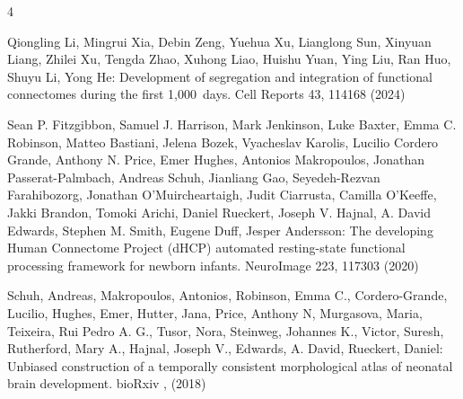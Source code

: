 \documentclass[runningheads,a4paper]{llncs}
\begin{document}
\begin{thebibliography}{4}

 Qiongling Li, Mingrui Xia, Debin Zeng, Yuehua Xu, Lianglong Sun, Xinyuan Liang, Zhilei Xu, Tengda Zhao, Xuhong Liao, Huishu Yuan, Ying Liu, Ran Huo, Shuyu Li, Yong He: Development of segregation and integration of functional connectomes during the first 1,000 days. Cell Reports 43, 114168 (2024)




 Sean P. Fitzgibbon, Samuel J. Harrison, Mark Jenkinson, Luke Baxter, Emma C. Robinson, Matteo Bastiani, Jelena Bozek, Vyacheslav Karolis, Lucilio {Cordero Grande}, Anthony N. Price, Emer Hughes, Antonios Makropoulos, Jonathan Passerat-Palmbach, Andreas Schuh, Jianliang Gao, Seyedeh-Rezvan Farahibozorg, Jonathan O'Muircheartaigh, Judit Ciarrusta, Camilla O'Keeffe, Jakki Brandon, Tomoki Arichi, Daniel Rueckert, Joseph V. Hajnal, A. David Edwards, Stephen M. Smith, Eugene Duff, Jesper Andersson: The developing Human Connectome Project (dHCP) automated resting-state functional processing framework for newborn infants. NeuroImage 223, 117303 (2020)

 Schuh, Andreas, Makropoulos, Antonios, Robinson, Emma C., Cordero-Grande, Lucilio, Hughes, Emer, Hutter, Jana, Price, Anthony N, Murgasova, Maria, Teixeira, Rui Pedro A. G., Tusor, Nora, Steinweg, Johannes K., Victor, Suresh, Rutherford, Mary A., Hajnal, Joseph V., Edwards, A. David, Rueckert, Daniel: Unbiased construction of a temporally consistent morphological atlas of neonatal brain development. bioRxiv ,  (2018)


\end{thebibliography}
\end{document}
